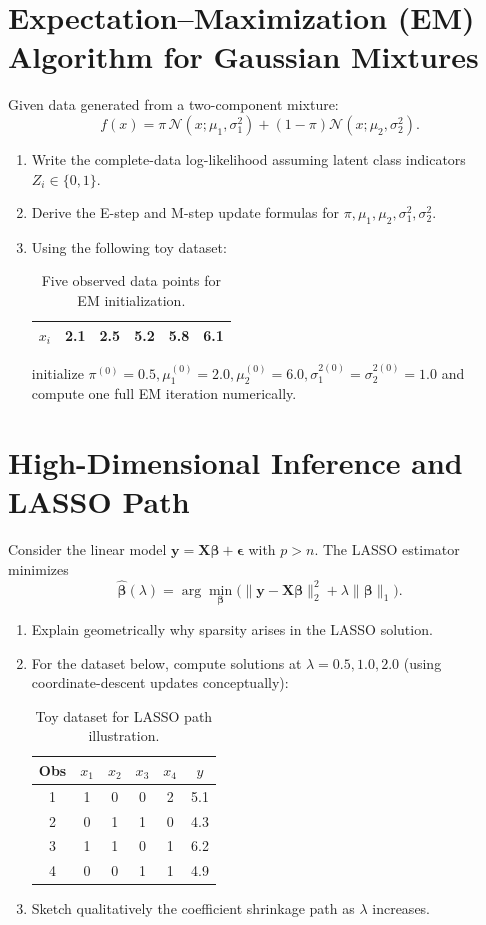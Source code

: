 \documentclass[12pt,a4paper]{article}
\begin{document}
\section{Expectation–Maximization (EM) Algorithm for Gaussian Mixtures}
Given data generated from a two-component mixture:
\[
f(x) = \pi\,\mathcal{N}(x;\mu_1,\sigma_1^2) + (1-\pi)\mathcal{N}(x;\mu_2,\sigma_2^2).
\]
\begin{enumerate}[label=(\arabic*)]
\item Write the complete-data log-likelihood assuming latent class indicators \( Z_i\in\{0,1\} \).
\item Derive the E-step and M-step update formulas for \( \pi,\mu_1,\mu_2,\sigma_1^2,\sigma_2^2 \).
\item Using the following toy dataset:

\begin{table}[H]
\centering
\begin{tabular}{c c c c c c}
\toprule
$x_i$ & 2.1 & 2.5 & 5.2 & 5.8 & 6.1 \\
\bottomrule
\end{tabular}
\caption{Five observed data points for EM initialization.}
\end{table}

initialize \( \pi^{(0)}=0.5,\mu_1^{(0)}=2.0,\mu_2^{(0)}=6.0,\sigma_1^{2(0)}=\sigma_2^{2(0)}=1.0 \)
and compute one full EM iteration numerically.
\end{enumerate}


\section{High-Dimensional Inference and LASSO Path}
Consider the linear model \( \mathbf{y} = \mathbf{X}\boldsymbol{\beta} + \boldsymbol{\epsilon} \)
with \( p>n \). The LASSO estimator minimizes
\[
\hat{\boldsymbol{\beta}}(\lambda) =
\arg\min_{\boldsymbol{\beta}}\big(\|\mathbf{y}-\mathbf{X}\boldsymbol{\beta}\|_2^2
+ \lambda\|\boldsymbol{\beta}\|_1\big).
\]
\begin{enumerate}[label=(\arabic*)]
\item Explain geometrically why sparsity arises in the LASSO solution.
\item For the dataset below, compute solutions at \( \lambda = 0.5, 1.0, 2.0 \)
(using coordinate-descent updates conceptually):

\begin{table}[H]
\centering
\begin{tabular}{c|cccc|c}
\toprule
Obs & $x_1$ & $x_2$ & $x_3$ & $x_4$ & $y$ \\
\midrule
1 & 1 & 0 & 0 & 2 & 5.1 \\
2 & 0 & 1 & 1 & 0 & 4.3 \\
3 & 1 & 1 & 0 & 1 & 6.2 \\
4 & 0 & 0 & 1 & 1 & 4.9 \\
\bottomrule
\end{tabular}
\caption{Toy dataset for LASSO path illustration.}
\end{table}

\item Sketch qualitatively the coefficient shrinkage path as \( \lambda \) increases.
\end{enumerate}
\end{document}
